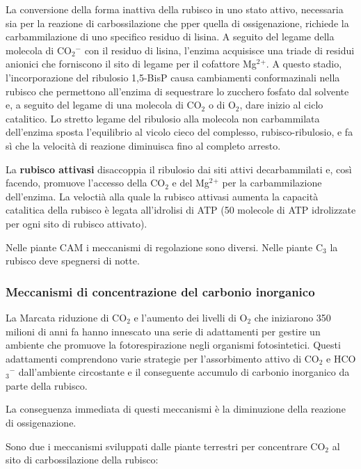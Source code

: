 \documentclass[]{article}
\begin{document}
La conversione della forma inattiva della rubisco in uno stato attivo,
necessaria sia per la reazione di carbossilazione che pper quella di
ossigenazione, richiede la carbammilazione di uno specifico residuo di
lisina. A seguito del legame della molecola di CO$_2$$^-$ con il residuo
di lisina, l'enzima acquisisce una triade di residui anionici che
forniscono il sito di legame per il cofattore Mg$^2$$^+$. A questo
stadio, l'incorporazione del ribulosio 1,5-BisP causa cambiamenti
conformazinali nella rubisco che permettono all'enzima di sequestrare lo
zucchero fosfato dal solvente e, a seguito del legame di una molecola di
CO$_2$ o di O$_2$, dare inizio al ciclo catalitico. Lo stretto legame
del ribulosio alla molecola non carbammilata dell'enzima sposta
l'equilibrio al vicolo cieco del complesso, rubisco-ribulosio, e fa sì
che la velocità di reazione diminuisca fino al completo arresto.

La \textbf{rubisco attivasi} disaccoppia il ribulosio dai siti attivi
decarbammilati e, così facendo, promuove l'accesso della CO$_2$ e del
Mg$^2$$^+$ per la carbammilazione dell'enzima. La veloctià alla quale la
rubisco attivasi aumenta la capacità catalitica della rubisco è legata
all'idrolisi di ATP (50 molecole di ATP idrolizzate per ogni sito di
rubisco attivato).

Nelle piante CAM i meccanismi di regolazione sono diversi. Nelle piante
C$_3$ la rubisco deve spegnersi di notte.

\subsubsection{Meccanismi di concentrazione del carbonio
inorganico}\label{meccanismi-di-concentrazione-del-carbonio-inorganico}

La Marcata riduzione di CO$_2$ e l'aumento dei livelli di O$_2$ che
iniziarono 350 milioni di anni fa hanno innescato una serie di
adattamenti per gestire un ambiente che promuove la fotorespirazione
negli organismi fotosintetici. Questi adattamenti comprendono varie
strategie per l'assorbimento attivo di CO$_2$ e HCO$_3$$^-$
dall'ambiente circostante e il conseguente accumulo di carbonio
inorganico da parte della rubisco.

La conseguenza immediata di questi meccanismi è la diminuzione della
reazione di ossigenazione.

Sono due i meccanismi sviluppati dalle piante terrestri per concentrare
CO$_2$ al sito di carbossilazione della rubisco:
\end{document}
